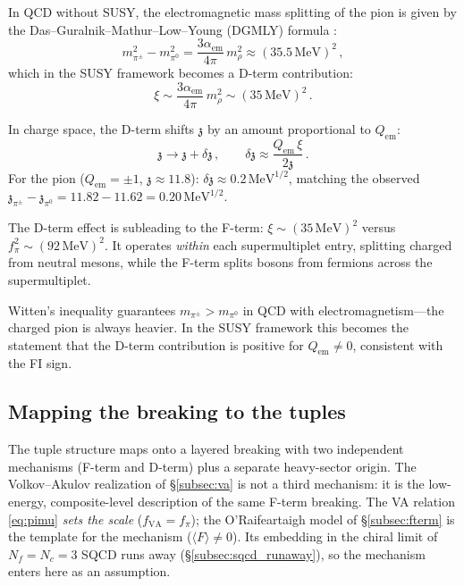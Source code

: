 \documentclass[12pt,a4paper]{article}
\newcommand{\MeV}{\,\text{MeV}}
\newcommand{\zch}{\mathfrak{z}}
\begin{document}
In QCD without SUSY, the electromagnetic mass splitting of the 
pion is given by the Das--Guralnik--Mathur--Low--Young (DGMLY) 
formula \cite{DGMLY1967}:
\begin{equation}
m_{\pi^\pm}^2 - m_{\pi^0}^2 = \frac{3\alpha_{\text{em}}}{4\pi}\,
m_\rho^2
\approx (35.5\MeV)^2\,,
\end{equation}
which in the SUSY framework becomes a D-term contribution:
\begin{equation}
\xi \sim \frac{3\alpha_{\text{em}}}{4\pi}\,m_\rho^2 
\sim (35\MeV)^2\,.
\end{equation}

In charge space, the D-term shifts $\zch$ by an amount proportional 
to $Q_{\text{em}}$:
\begin{equation}
\zch \to \zch + \delta\zch\,, \qquad 
\delta\zch \approx \frac{Q_{\text{em}}\,\xi}{2\zch}\,.
\end{equation}
For the pion ($Q_{\text{em}} = \pm 1$, $\zch \approx 11.8$): 
$\delta\zch \approx 0.2\MeV^{1/2}$, matching the observed 
$\zch_{\pi^\pm} - \zch_{\pi^0} = 11.82 - 11.62 = 0.20\MeV^{1/2}$.

The D-term effect is subleading to the F-term: 
$\xi \sim (35\MeV)^2$ versus $f_\pi^2 \sim (92\MeV)^2$. It 
operates \emph{within} each supermultiplet entry, splitting charged 
from neutral mesons, while the F-term splits bosons from fermions 
across the supermultiplet.

Witten's inequality \cite{Witten1983} guarantees 
$m_{\pi^\pm} > m_{\pi^0}$ in QCD with electromagnetism---the 
charged pion is always heavier. In the SUSY framework this 
becomes the statement that the D-term contribution is positive 
for $Q_{\text{em}} \neq 0$, consistent with the FI sign.

\subsection{Mapping the breaking to the tuples}
\label{subsec:layers}
The tuple structure maps onto a layered breaking with two independent 
mechanisms (F-term and D-term) plus a separate heavy-sector origin. 
The Volkov--Akulov realization of \S\ref{subsec:va} is not a third 
mechanism: it is the low-energy, composite-level description of the 
same F-term breaking. The VA relation \eqref{eq:pimu} \emph{sets the
scale} ($f_{\text{VA}} = f_\pi$); the O'Raifeartaigh model
of \S\ref{subsec:fterm} is the template for the mechanism
($\langle F\rangle \neq 0$). Its embedding in the chiral limit of
$N_f = N_c = 3$ SQCD runs away (\S\ref{subsec:sqcd_runaway}), so the
mechanism enters here as an assumption.
\end{document}
